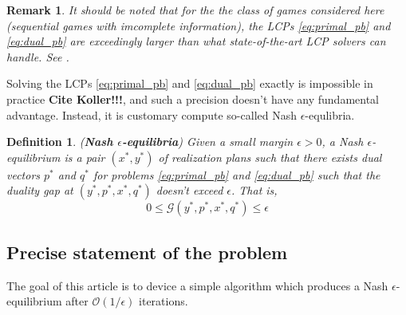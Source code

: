 \documentclass{article} %
\newtheorem{definition}[theorem]{Definition}
\newtheorem{remark}{Remark}
\begin{document}

\begin{remark}  
It should be noted that for the the class of games considered here (sequential games with imcomplete information), the LCPs \eqref{eq:primal_pb} and \eqref{eq:dual_pb} are exceedingly larger than what state-of-the-art LCP solvers can handle. See \cite{hoda2010smoothing}.
\end{remark}

Solving the LCPs \eqref{eq:primal_pb} and \eqref{eq:dual_pb} exactly is impossible in practice \textbf{Cite Koller!!!}, and such a precision doesn't have any fundamental advantage. Instead, it is customary compute so-called Nash $\epsilon$-equlibria.

\begin{definition}(\textbf{Nash $\epsilon$-equilibria})
Given a small margin $\epsilon > 0$, a Nash $\epsilon$-equilibrium is a pair $(x^*, y^*)$ of realization plans such that there exists dual vectors $p^*$ and $q^*$ for problems \eqref{eq:primal_pb} and \eqref{eq:dual_pb} such that the duality gap at $(y^*, p^*, x^*, q^*)$ doesn't exceed $\epsilon$. That is,
\begin{equation}
  0 \le \mathcal{G}(y^*, p^*, x^*, q^*) \le \epsilon
\label{eq:approx_pb}
\end{equation}
\end{definition}

\subsection{Precise statement of the problem}
The goal of this article is to device a simple algorithm which produces a Nash $\epsilon$-equilibrium after $\mathcal{O}(1/\epsilon)$ iterations.
\end{document}
